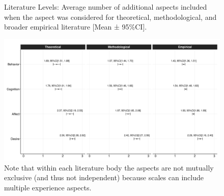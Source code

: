 \begin{figure}[h]
\centering
\caption{Literature Levels: Average number of additional aspects included when the aspect was considered for theoretical, methodological, and broader empirical literature [Mean ± 95\%CI].}
\includegraphics[width=\textwidth]{Figures/CombinedAspectComplexityMean-1}
\caption*{Note that within each literature body the aspects are not mutually exclusive (and thus not independent) because scales can include multiple experience aspects.}
\label{fig:CombinedAspectComplexity}
\end{figure}

